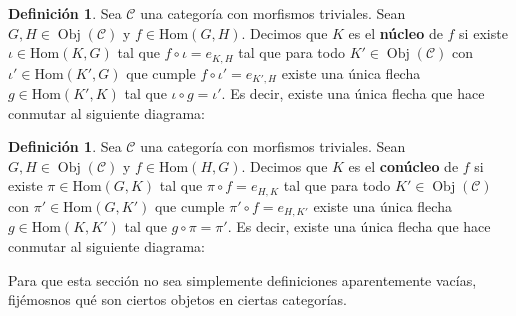 \documentclass[12pt]{book}
\theoremstyle{definition}
\newtheorem{defn}[teo]{Definición}
\renewcommand{\hom}{\mathrm{Hom}}
\DeclareMathOperator{\Obj}{Obj}
\begin{document}
\begin{defn}
Sea $\mathcal{C}$ una categoría con morfismos triviales. Sean $G,H\in\Obj(\mathcal{C})$ y $f\in\hom(G,H)$. Decimos que $K$ es el \textbf{núcleo} de $f$ si existe $\iota\in\hom(K,G)$ tal que $f\circ \iota = e_{K,H}$ tal que para todo $K'\in\Obj(\mathcal{C})$ con $\iota' \in \hom(K',G)$ que cumple $f\circ \iota' = e_{K',H}$ existe una única flecha $g\in\hom(K',K)$ tal que $\iota \circ g = \iota'$. Es decir, existe una única flecha que hace conmutar al siguiente diagrama:
\begin{center}
\end{center}
\end{defn}
\begin{defn}
Sea $\mathcal{C}$ una categoría con morfismos triviales. Sean $G,H\in\Obj(\mathcal{C})$ y $f\in\hom(H,G)$. Decimos que $K$ es el \textbf{conúcleo} de $f$ si existe $\pi\in\hom(G,K)$ tal que $\pi\circ f = e_{H,K}$ tal que para todo $K'\in\Obj(\mathcal{C})$ con $\pi' \in \hom(G,K')$ que cumple $\pi' \circ f = e_{H,K'}$ existe una única flecha $g\in\hom(K,K')$ tal que $g\circ \pi= \pi'$. Es decir, existe una única flecha que hace conmutar al siguiente diagrama:
\begin{center}
\end{center}
\end{defn}

Para que esta sección no sea simplemente definiciones aparentemente vacías, fijémosnos qué son ciertos objetos en ciertas categorías.
\end{document}
